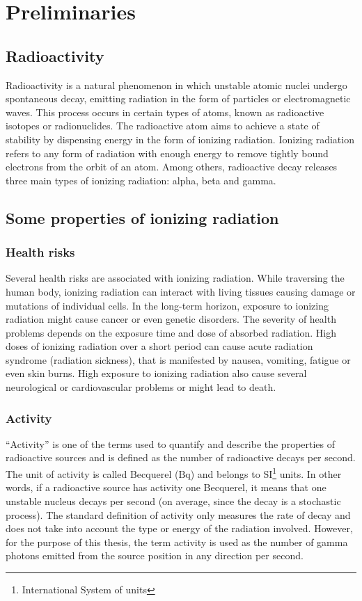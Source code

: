 

\chapter{Preliminaries\label{chap:preliminaries}}

\section{Radioactivity}
Radioactivity is a natural phenomenon in which unstable atomic nuclei undergo spontaneous decay, emitting radiation in the form of particles or electromagnetic waves. 
This process occurs in certain types of atoms, known as radioactive isotopes or radionuclides. 
The radioactive atom aims to achieve a state of stability by dispensing energy in the form of ionizing radiation.
Ionizing radiation refers to any form of radiation with enough energy to remove tightly bound electrons from the orbit of an atom.
Among others, radioactive decay releases three main types of ionizing radiation: alpha, beta and gamma. 

\section{Some properties of ionizing radiation}
\subsection{Health risks}%
Several health risks are associated with ionizing radiation.
While traversing the human body, ionizing radiation can interact with living tissues causing damage or mutations of individual cells.
In the long-term horizon, exposure to ionizing radiation might cause cancer or even genetic disorders.
The severity of health problems depends on the exposure time and dose of absorbed radiation.
High doses of ionizing radiation over a short period can cause acute radiation syndrome (radiation sickness), that is manifested by nausea, vomiting, fatigue or even skin burns. 
High exposure to ionizing radiation also cause several neurological or cardiovascular problems or might lead to death.%

\subsection{Activity}%
``Activity'' is one of the terms used to quantify and describe the properties of radioactive sources and is defined as the number of radioactive decays per second.
The unit of activity is called Becquerel ($\si{\becquerel}$) and belongs to SI\footnote{International System of units} units.
In other words, if a radioactive source has activity one Becquerel, it means that one unstable nucleus decays per second (on average, since the decay is a stochastic process).
The standard definition of activity only measures the rate of decay and does not take into account the type or energy of the radiation involved.
However, for the purpose of this thesis, the term activity is used as the number of gamma photons emitted from the source position in any direction per second.

